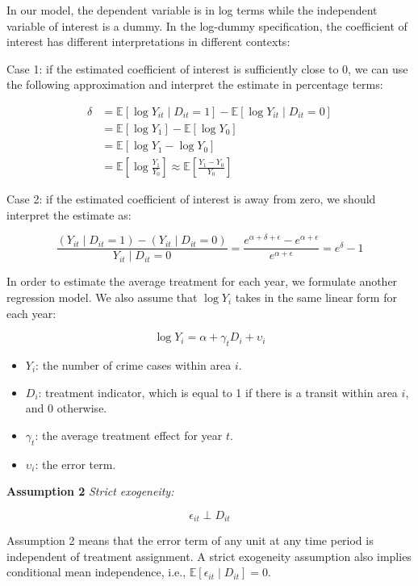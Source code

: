 \documentclass[a4paper, 11pt]{article}
\begin{document}
In our model, the dependent variable is in log terms while the independent variable of interest is a dummy. In the log-dummy specification, the coefficient of interest has different interpretations in different contexts:

Case 1: if the estimated coefficient of interest is sufficiently close to 0, we can use the following approximation and interpret the estimate in percentage terms:

\begin{align*}
    \delta &= \mathbb{E}[\log Y_{it}\mid D_{it}=1] - \mathbb{E}[\log Y_{it}\mid D_{it}=0] \\
    &= \mathbb{E}[\log Y_1] - \mathbb{E}[\log Y_0] \\
    &= \mathbb{E}[\log Y_1 - \log Y_0] \\
    &= \mathbb{E}\left[\log\frac{Y_1}{Y_0}\right]
    \approx \mathbb{E}\left[\frac{Y_1 - Y_0}{Y_0} \right]
\end{align*}

Case 2: if the estimated coefficient of interest is away from zero, we should interpret the estimate as:

\begin{equation*}
     \frac{(Y_{it}\mid D_{it}=1) - (Y_{it}\mid D_{it}=0)}{Y_{it}\mid D_{it}=0}
    =\frac{e^{\alpha+\delta+\epsilon} - e^{\alpha+\epsilon}}{e^{\alpha+\epsilon}}=e^{\delta}-1
\end{equation*}

In order to estimate the average treatment for each year, we formulate another regression model. We also assume that $\log Y_i$ takes in the same linear form for each year:

\[\log Y_{i}=\alpha+\gamma_{t} D_{i}+\upsilon_{i} \]

\begin{itemize}
    \item $Y_{i}$: the number of crime cases within area $i$.
    \item $D_{i}$: treatment indicator, which is equal to 1 if there is a transit within area $i$, and 0 otherwise.
    \item $\gamma_t$: the average treatment effect for year $t$.
    \item $\upsilon_{i}$: the error term.
\end{itemize}

\textbf{Assumption 2 } \textit{Strict exogeneity:}

\[\epsilon_{it}\perp D_{it} \]

Assumption 2 means that the error term of any unit at any time period is independent of treatment assignment. A strict exogeneity assumption also implies conditional mean independence, i.e., $\mathbb{E}[\epsilon_{it}\mid D_{it}]=0$.
\end{document}
